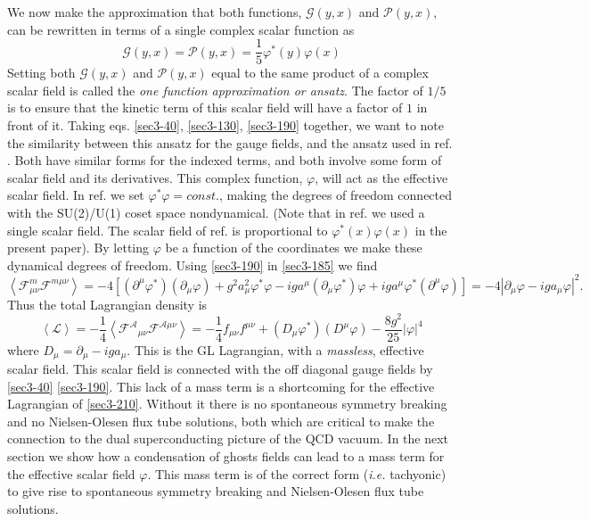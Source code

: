 \documentclass[a4paper,aps,showpacs]{revtex4}
\begin{document}
We now make the
approximation that both functions, $\mathcal G (y,x)$ and $\mathcal P (y,x)$, 
can be rewritten in terms of a single complex scalar function as
\begin{equation}
  \mathcal G (y,x) = \mathcal P(y,x) = 
  \frac{1}{5} \varphi^*(y) \varphi(x) 
\label{sec3-190}
\end{equation}
Setting both $\mathcal G (y,x) $ and  $\mathcal P(y,x)$ equal
to the same product of a complex scalar field  is called the 
\textit{one function approximation or ansatz}. The factor of $1/5$
is to ensure that the kinetic term of this scalar field will have a
factor of $1$ in front of it. Taking eqs.
\eqref{sec3-40}, \eqref{sec3-130}, \eqref{sec3-190} together, we
want to note the similarity between this ansatz for the gauge fields, and the
ansatz used in ref. \cite{corr}. Both have similar forms for the indexed
terms, and both involve some form of scalar field and its derivatives.  
This complex function, $\varphi$,  will act as the effective scalar field.
In ref. \cite{dzhsin02a} we set $\varphi^* \varphi = const.$, making the 
degrees of freedom connected with the SU(2)/U(1) coset space nondynamical.
(Note that in ref. \cite{dzhsin02a} we used a single scalar field. The scalar
field of ref. \cite{dzhsin02a} is proportional to $\varphi^*(x) \varphi(x) $
in the present paper). By letting $\varphi$ be a function of the coordinates
we make these dynamical degrees of freedom.
Using \eqref{sec3-190} in \eqref{sec3-185} we find
\begin{equation}
  \left\langle
  \mathcal F^m_{\mu \nu} \mathcal F^{m \mu \nu}
  \right\rangle = 
  -4\left[
  \left( \partial^\mu \varphi^* \right)
  \left( \partial_\mu \varphi \right) + g^2 a^2_\mu \varphi^* \varphi - 
  i g a^\mu \left( \partial_\mu \varphi^* \right) \varphi + 
  i g a^\mu \varphi^* \left( \partial^\mu \varphi \right)
  \right] = 
  -4\left| \partial_\mu \varphi - i ga_\mu \varphi \right|^2 .
\label{sec3-200}
\end{equation}
Thus the total Lagrangian density is 
\begin{equation}
  \left \langle {\mathcal L} \right\rangle = 
  - \frac{1}{4} \left \langle 
  \mathcal {F^A}_{\mu \nu} \mathcal F^{\mathcal A \mu \nu} 
   \right\rangle = - \frac{1}{4}f_{\mu \nu} f^{\mu \nu} + 
    \left( D_\mu \varphi^* \right) \left( D^\mu \varphi \right) - 
   \frac{8 g^2}{25} \left| \varphi \right|^4 
\label{sec3-210}
\end{equation}
where $D_\mu = \partial_\mu - i g a_\mu$. This is the GL
Lagrangian,  with a {\it massless}, effective scalar field. This
scalar field is connected with the off diagonal gauge fields by 
\eqref{sec3-40} \eqref{sec3-190}. This lack of a mass
term is a shortcoming for the effective Lagrangian  of  \eqref{sec3-210}.
Without it there is no spontaneous symmetry breaking and
no Nielsen-Olesen flux tube solutions, both which are critical to
make the connection to the dual superconducting picture of the QCD vacuum.
In the next section we show how a condensation of ghosts fields can
lead to a mass term for the effective scalar field $\varphi$.
This mass term is of the correct form ({\it i.e.} tachyonic) to give rise to
spontaneous symmetry breaking and Nielsen-Olesen flux tube solutions. 
\end{document}
